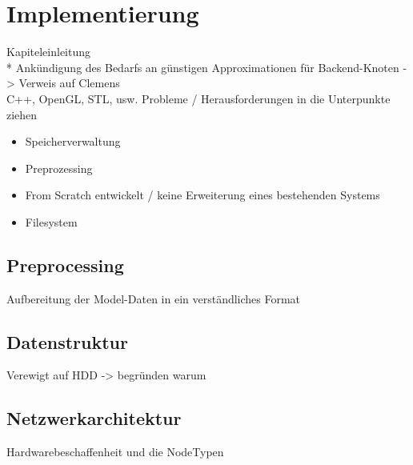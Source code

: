 
\chapter{Implementierung}
\label{impl}
Kapiteleinleitung\\*
Ankündigung des Bedarfs an günstigen Approximationen für Backend-Knoten -> Verweis auf Clemens\\
C++, OpenGL, STL, usw.
Probleme / Herausforderungen in die Unterpunkte ziehen
\begin{itemize}
 \item Speicherverwaltung
 \item Preprozessing
 \item From Scratch entwickelt / keine Erweiterung eines bestehenden Systems
 \item Filesystem
\end{itemize}
\section{Preprocessing}
\label{impl:preprocessing}
Aufbereitung der Model-Daten in ein verständliches Format
\section{Datenstruktur}
\label{impl:datenstruktur}
Verewigt auf HDD -> begründen warum
\section{Netzwerkarchitektur}
\label{impl:netzwerkarchitektur}
Hardwarebeschaffenheit und die NodeTypen
